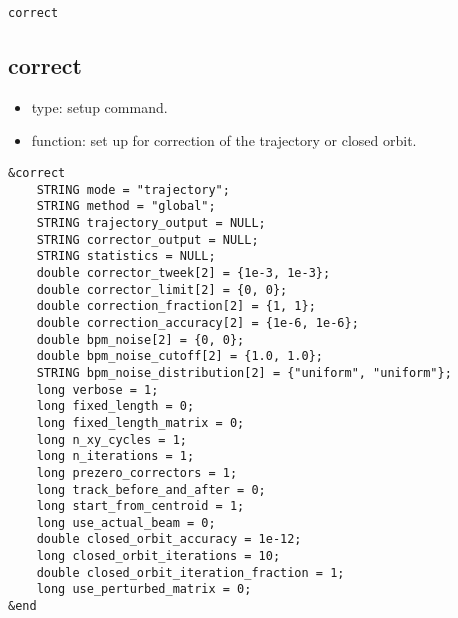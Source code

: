 \documentclass[11pt]{article}
\begin{document}
\begin{latexonly}
\newpage
\begin{center}{\Large\verb|correct|}\end{center}
\end{latexonly}
\subsection{correct}

\begin{itemize}
\item type: setup command.
\item function: set up for correction of the trajectory or closed orbit.
\end{itemize}

\begin{verbatim}
&correct
    STRING mode = "trajectory";
    STRING method = "global";
    STRING trajectory_output = NULL;
    STRING corrector_output = NULL;
    STRING statistics = NULL;
    double corrector_tweek[2] = {1e-3, 1e-3};
    double corrector_limit[2] = {0, 0};
    double correction_fraction[2] = {1, 1};
    double correction_accuracy[2] = {1e-6, 1e-6};
    double bpm_noise[2] = {0, 0};
    double bpm_noise_cutoff[2] = {1.0, 1.0};
    STRING bpm_noise_distribution[2] = {"uniform", "uniform"};
    long verbose = 1;
    long fixed_length = 0;
    long fixed_length_matrix = 0;
    long n_xy_cycles = 1;
    long n_iterations = 1;
    long prezero_correctors = 1;
    long track_before_and_after = 0;
    long start_from_centroid = 1;
    long use_actual_beam = 0;
    double closed_orbit_accuracy = 1e-12;
    long closed_orbit_iterations = 10;
    double closed_orbit_iteration_fraction = 1;
    long use_perturbed_matrix = 0;
&end
\end{verbatim}
\end{document}
